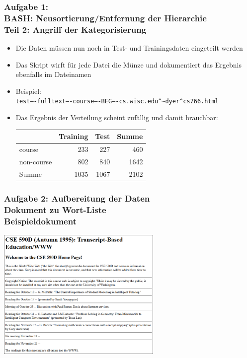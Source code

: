 \documentclass[accentcolor=tud7b,noresetcounter]{tudbeamer}
\begin{document}
	\begin{frame}
		\frametitle{Aufgabe 1: \\ BASH: Neusortierung/Entfernung der Hierarchie \\ Teil 2: Angriff der Kategorisierung}
		\begin{itemize}
			\item Die Daten müssen nun noch in Test- und Trainingsdaten eingeteilt werden
			\item Das Skript wirft für jede Datei die Münze und dokumentiert das Ergebnis ebenfalls im Dateinamen
			\item Beispiel: \\
			\texttt{test----fulltext----course----BEG----cs.wisc.edu\^{}\~{}dyer\^{}cs766.html}
			\item Das Ergebnis der Verteilung scheint zufällig und damit brauchbar: \\
			\begin{tabular}{|l|r|r||r|}
				\hline
& Training	& Test	& 	Summe \\
\hline
course	& 	233	& 	227	& 	460	\\
non-course	& 	802	& 	840	& 	1642	\\
\hline
\hline
Summe	& 	1035	& 	1067	& 2102\\
				\hline
			\end{tabular}


		\end{itemize}

	\end{frame}
	
	
	\begin{frame}
		\frametitle{Aufgabe 2: Aufbereitung der Daten\\Dokument zu Wort-Liste\\Beispieldokument}
		\begin{center}
			\includegraphics[height=180pt]{img/sample2}
		\end{center}
	\end{frame}
	
\end{document}
